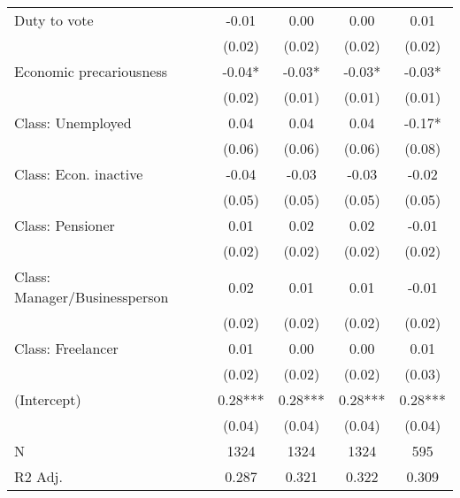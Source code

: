 \begin{tabular}[t]{lcccc}
Duty to vote & -0.01 & 0.00 & 0.00 & 0.01\\
 & (0.02) & (0.02) & (0.02) & \vphantom{2} (0.02)\\
Economic  precariousness & -0.04* & -0.03* & -0.03* & -0.03*\\
 & (0.02) & (0.01) & (0.01) & (0.01)\\
Class: Unemployed & 0.04 & 0.04 & 0.04 & -0.17*\\
 & (0.06) & (0.06) & (0.06) & (0.08)\\
Class: Econ. inactive & -0.04 & -0.03 & -0.03 & -0.02\\
 & (0.05) & (0.05) & (0.05) & (0.05)\\
Class: Pensioner & 0.01 & 0.02 & 0.02 & -0.01\\
 & (0.02) & (0.02) & (0.02) & \vphantom{1} (0.02)\\
Class: Manager/Businessperson & 0.02 & 0.01 & 0.01 & -0.01\\
 & (0.02) & (0.02) & (0.02) & (0.02)\\
Class: Freelancer & 0.01 & 0.00 & 0.00 & 0.01\\
 & (0.02) & (0.02) & (0.02) & (0.03)\\
(Intercept) & 0.28*** & 0.28*** & 0.28*** & 0.28***\\
 & (0.04) & (0.04) & (0.04) & (0.04)\\
\midrule
N & 1324 & 1324 & 1324 & 595\\
R2 Adj. & 0.287 & 0.321 & 0.322 & 0.309\\
\bottomrule
\end{tabular}
